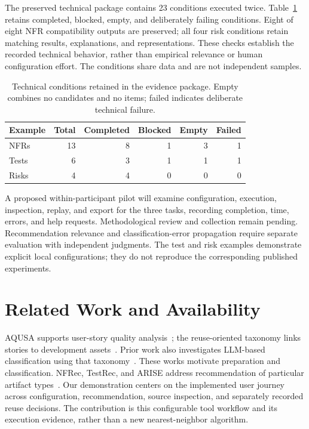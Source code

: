 \documentclass[10pt,conference]{IEEEtran}
\begin{document}
The preserved technical package contains 23 conditions executed twice. Table~\ref{tab:conditions} retains completed, blocked, empty, and deliberately failing conditions. Eight of eight NFR compatibility outputs are preserved; all four risk conditions retain matching results, explanations, and representations. These checks establish the recorded technical behavior, rather than empirical relevance or human configuration effort. The conditions share data and are not independent samples.

\begin{table}[t]
  \caption{Technical conditions retained in the evidence package. Empty combines no candidates and no items; failed indicates deliberate technical failure.}
  \label{tab:conditions}
  \centering
  \begin{tabular}{@{}lrrrrr@{}}
    \toprule
    Example & Total & Completed & Blocked & Empty & Failed \\
    \midrule
    NFRs & 13 & 8 & 1 & 3 & 1 \\
    Tests & 6 & 3 & 1 & 1 & 1 \\
    Risks & 4 & 4 & 0 & 0 & 0 \\
    \bottomrule
  \end{tabular}
\end{table}

A proposed within-participant pilot will examine configuration, execution, inspection, replay, and export for the three tasks, recording completion, time, errors, and help requests. Methodological review and collection remain pending. Recommendation relevance and classification-error propagation require separate evaluation with independent judgments. The test and risk examples demonstrate explicit local configurations; they do not reproduce the corresponding published experiments.

\section{Related Work and Availability}
AQUSA supports user-story quality analysis~\cite{lucassen2016quality}; the reuse-oriented taxonomy links stories to development assets~\cite{dilorenzo2020wis}. Prior work also investigates LLM-based classification using that taxonomy~\cite{desouza2025automating}. These works motivate preparation and classification. NFRec, TestRec, and ARISE address recommendation of particular artifact types~\cite{ramos2025nfr,dilorenzo2026testrec,sousa2026arise}. Our demonstration centers on the implemented user journey across configuration, recommendation, source inspection, and separately recorded reuse decisions. The contribution is this configurable tool workflow and its execution evidence, rather than a new nearest-neighbor algorithm.
\end{document}
